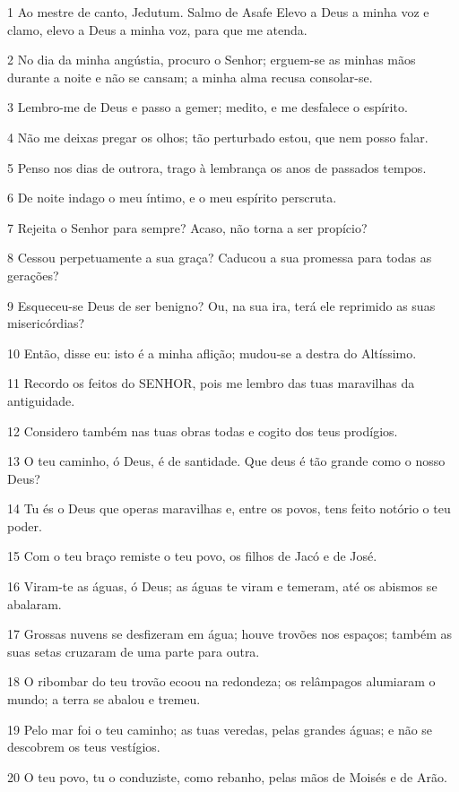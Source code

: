 \par 1 Ao mestre de canto, Jedutum. Salmo de Asafe Elevo a Deus a minha voz e clamo, elevo a Deus a minha voz, para que me atenda.
\par 2 No dia da minha angústia, procuro o Senhor; erguem-se as minhas mãos durante a noite e não se cansam; a minha alma recusa consolar-se.
\par 3 Lembro-me de Deus e passo a gemer; medito, e me desfalece o espírito.
\par 4 Não me deixas pregar os olhos; tão perturbado estou, que nem posso falar.
\par 5 Penso nos dias de outrora, trago à lembrança os anos de passados tempos.
\par 6 De noite indago o meu íntimo, e o meu espírito perscruta.
\par 7 Rejeita o Senhor para sempre? Acaso, não torna a ser propício?
\par 8 Cessou perpetuamente a sua graça? Caducou a sua promessa para todas as gerações?
\par 9 Esqueceu-se Deus de ser benigno? Ou, na sua ira, terá ele reprimido as suas misericórdias?
\par 10 Então, disse eu: isto é a minha aflição; mudou-se a destra do Altíssimo.
\par 11 Recordo os feitos do SENHOR, pois me lembro das tuas maravilhas da antiguidade.
\par 12 Considero também nas tuas obras todas e cogito dos teus prodígios.
\par 13 O teu caminho, ó Deus, é de santidade. Que deus é tão grande como o nosso Deus?
\par 14 Tu és o Deus que operas maravilhas e, entre os povos, tens feito notório o teu poder.
\par 15 Com o teu braço remiste o teu povo, os filhos de Jacó e de José.
\par 16 Viram-te as águas, ó Deus; as águas te viram e temeram, até os abismos se abalaram.
\par 17 Grossas nuvens se desfizeram em água; houve trovões nos espaços; também as suas setas cruzaram de uma parte para outra.
\par 18 O ribombar do teu trovão ecoou na redondeza; os relâmpagos alumiaram o mundo; a terra se abalou e tremeu.
\par 19 Pelo mar foi o teu caminho; as tuas veredas, pelas grandes águas; e não se descobrem os teus vestígios.
\par 20 O teu povo, tu o conduziste, como rebanho, pelas mãos de Moisés e de Arão.

